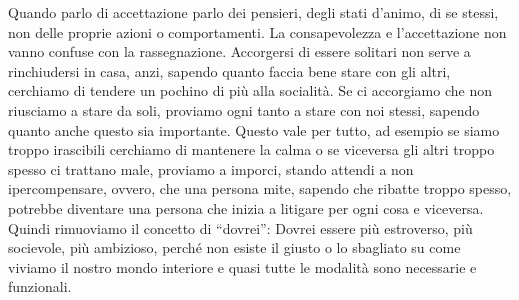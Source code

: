 \documentclass[12pt]{book} %
\begin{document}
Quando parlo di accettazione parlo dei pensieri, degli stati d'animo, di se stessi, non delle
proprie azioni o comportamenti. La consapevolezza e l'accettazione non vanno confuse con la
rassegnazione. Accorgersi di essere solitari non serve a rinchiudersi in casa, anzi, sapendo quanto faccia bene stare
con gli altri, cerchiamo di tendere un pochino di più alla socialità. Se ci accorgiamo che non riusciamo a stare da
soli, proviamo ogni tanto a stare con noi stessi, sapendo quanto anche questo sia importante. Questo vale per tutto, ad
esempio se siamo troppo irascibili cerchiamo di mantenere la calma o se viceversa gli altri troppo spesso ci trattano
male, proviamo a imporci, stando attendi a non ipercompensare, ovvero, che una persona mite, sapendo che ribatte troppo
spesso, potrebbe diventare una persona che inizia a litigare per ogni cosa e viceversa. Quindi rimuoviamo il concetto
di “dovrei”: Dovrei essere più estroverso, più socievole, più ambizioso, perché non esiste il giusto o lo sbagliato su
come viviamo il nostro mondo interiore e quasi tutte le modalità sono necessarie e funzionali.


\bigskip
\end{document}
